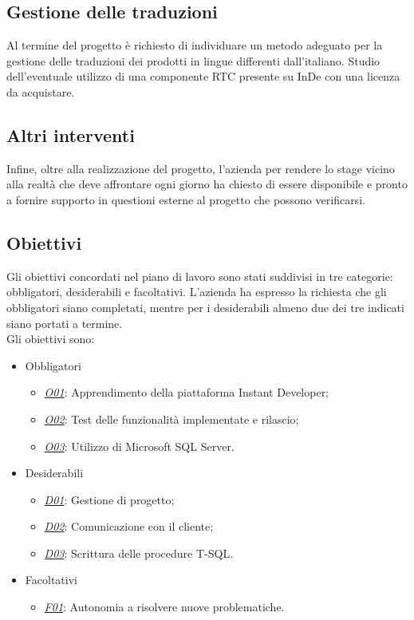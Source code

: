 \subsection{Gestione delle traduzioni}
Al termine del progetto è richiesto di individuare un metodo adeguato per la gestione delle traduzioni dei prodotti in lingue differenti dall'italiano. Studio dell'eventuale utilizzo di una componente RTC presente su InDe con una licenza da acquistare.

\subsection{Altri interventi}
Infine, oltre alla realizzazione del progetto, l'azienda per rendere lo stage vicino alla realtà che deve affrontare ogni giorno ha chiesto di essere disponibile e pronto a fornire supporto in questioni esterne al progetto che possono verificarsi.


\subsection{Obiettivi}
Gli obiettivi concordati nel piano di lavoro sono stati suddivisi in tre categorie: obbligatori, desiderabili e facoltativi. L'azienda ha espresso la richiesta che gli obbligatori siano completati, mentre per i desiderabili almeno due dei tre indicati siano portati a termine. \\
 
Gli obiettivi sono:
\begin{itemize}
	\item Obbligatori
	\begin{itemize}
		\item \underline{\textit{O01}}: Apprendimento della piattaforma Instant Developer;
		\item \underline{\textit{O02}}: Test delle funzionalità implementate e rilascio;
		\item \underline{\textit{O03}}: Utilizzo di Microsoft SQL Server.
	\end{itemize}
	
	\item Desiderabili 
	\begin{itemize}
		\item \underline{\textit{D01}}: Gestione di progetto;
		\item \underline{\textit{D02}}: Comunicazione con il cliente;
		\item \underline{\textit{D03}}: Scrittura delle procedure T-SQL.
	\end{itemize}
	
	\item Facoltativi
	\begin{itemize}
		\item \underline{\textit{F01}}: Autonomia a risolvere nuove problematiche.
	\end{itemize} 
\end{itemize}


